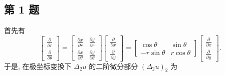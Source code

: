 \documentclass[../main.tex]{subfiles}
\begin{document}
\subsection{第 1 题}
首先有
\[
    \begin{bmatrix}
        \frac{\partial}{\partial r} \\
        \frac{\partial}{\partial \theta}
    \end{bmatrix}
    =
    \begin{bmatrix}
        \frac{\partial x}{\partial r} & \frac{\partial y}{\partial r} \\
        \frac{\partial x}{\partial \theta} & \frac{\partial y}{\partial \theta}
    \end{bmatrix}
    \begin{bmatrix}
        \frac{\partial}{\partial x} \\
        \frac{\partial}{\partial y}
    \end{bmatrix}
    =
    \begin{bmatrix}
        \cos \theta & \sin \theta \\
        -r \sin \theta & r \cos \theta
    \end{bmatrix}
    \begin{bmatrix}
        \frac{\partial}{\partial x} \\
        \frac{\partial}{\partial y}
    \end{bmatrix}
    .
\]
于是, 在极坐标变换下 $\Delta_2 u$ 的二阶微分部分 $\left( \Delta_2 u \right)_2$ 为
\end{document}
